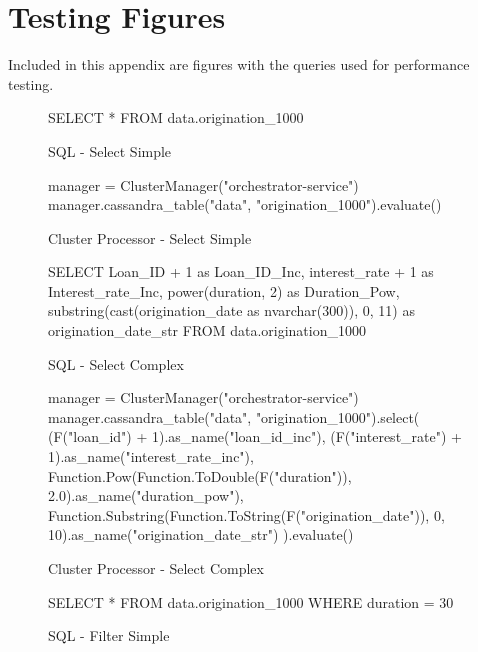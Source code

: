 
\chapter{Testing Figures}\label{cha:testing-figs}

Included in this appendix are figures with the queries used for performance testing.

\begin{figure}[h]
	\centering
	\begin{SQL}
SELECT * FROM data.origination_1000
	\end{SQL}
	\caption{SQL - Select Simple}
	\label{fig:sql-select-simple}
\end{figure}
	
\begin{figure}[h]
	\begin{python}
manager = ClusterManager("orchestrator-service")
manager.cassandra_table("data", "origination_1000").evaluate()
	\end{python}
	\caption{Cluster Processor - Select Simple}
	\label{fig:cluster-select-simple}
\end{figure}

\begin{figure}[h]
	\centering
	\begin{SQL}
SELECT 
Loan_ID + 1 as Loan_ID_Inc, 
interest_rate + 1 as Interest_rate_Inc, 
power(duration, 2) as Duration_Pow, 
substring(cast(origination_date as nvarchar(300)), 0, 11) as origination_date_str 
FROM data.origination_1000
	\end{SQL}
	\caption{SQL - Select Complex}
	\label{fig:sql-select-complex}
\end{figure}

\begin{figure}[h]
	\begin{python}
manager = ClusterManager("orchestrator-service")
manager.cassandra_table("data", "origination_1000").select(
(F("loan_id") + 1).as_name("loan_id_inc"), 
(F("interest_rate") + 1).as_name("interest_rate_inc"),
Function.Pow(Function.ToDouble(F("duration")), 2.0).as_name("duration_pow"),
Function.Substring(Function.ToString(F("origination_date")), 0, 10).as_name("origination_date_str")
).evaluate()
	\end{python}
	\caption{Cluster Processor - Select Complex}
	\label{fig:cluster-select-complex}
\end{figure}

\begin{figure}[h]
	\centering
	\begin{SQL}
SELECT *
FROM data.origination_1000
WHERE duration = 30
	\end{SQL}
	\caption{SQL - Filter Simple}
	\label{fig:sql-filter-simple}
\end{figure}


